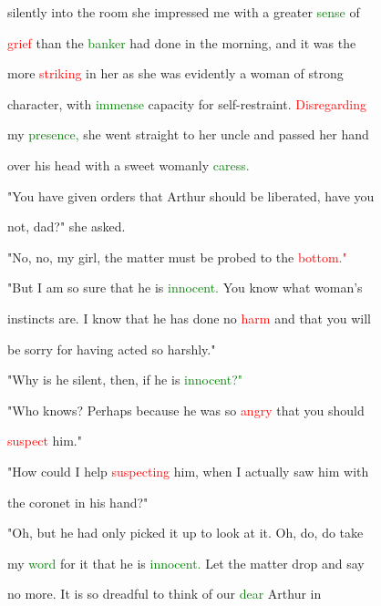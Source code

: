  silently into the room she impressed me with a greater \textcolor{green}{sense} of

 \textcolor{red}{grief} than the \textcolor{green}{banker} had done in the morning, and it was the

 more \textcolor{red}{striking} in her as she was evidently a woman of strong

 character, with \textcolor{green}{immense} capacity for self-restraint. \textcolor{red}{Disregarding}

 my \textcolor{green}{presence,} she went straight to her uncle and passed her hand

 over his head with a \textcolor{BurntOrange}{sweet} womanly \textcolor{green}{caress.}



 "You have given orders that Arthur should be \textcolor{BurntOrange}{liberated,} have you

 not, dad?" she asked.



 "No, no, my girl, the matter must be probed to the \textcolor{red}{bottom."}



 "But I am so sure that he is \textcolor{green}{innocent.} You know what woman's

 instincts are. I know that he has done no \textcolor{red}{harm} and that you will

 be sorry for having acted so harshly."



 "Why is he silent, then, if he is \textcolor{green}{innocent?"}



 "Who knows? Perhaps because he was so \textcolor{red}{angry} that you should

 \textcolor{red}{suspect} him."



 "How could I help \textcolor{red}{suspecting} him, when I actually saw him with

 the coronet in his hand?"



 "Oh, but he had only picked it up to look at it. Oh, do, do take

 my \textcolor{green}{word} for it that he is \textcolor{green}{innocent.} Let the matter drop and say

 no more. It is so \textcolor{BurntOrange}{dreadful} to think of our \textcolor{green}{dear} Arthur in

